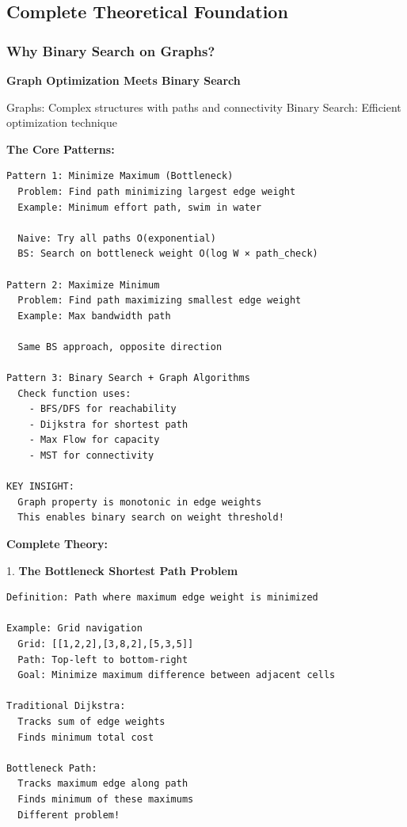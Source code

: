 \documentclass[11pt,a4paper,oneside]{book}
\begin{document}
\subsection{Complete Theoretical Foundation}

\subsubsection{Why Binary Search on Graphs?}

\begin{tcolorbox}[
    enhanced,breakable,
    colback=white,
    colframe=deepblue,
    boxrule=1.5pt,
    arc=3mm,
    title=\textbf{The Bottleneck and Reachability Paradigm}
]
\textbf{Graph Optimization Meets Binary Search}

Graphs: Complex structures with paths and connectivity
Binary Search: Efficient optimization technique

\textbf{The Core Patterns:}
\begin{verbatim}
Pattern 1: Minimize Maximum (Bottleneck)
  Problem: Find path minimizing largest edge weight
  Example: Minimum effort path, swim in water
  
  Naive: Try all paths O(exponential)
  BS: Search on bottleneck weight O(log W × path_check)

Pattern 2: Maximize Minimum  
  Problem: Find path maximizing smallest edge weight
  Example: Max bandwidth path
  
  Same BS approach, opposite direction

Pattern 3: Binary Search + Graph Algorithms
  Check function uses:
    - BFS/DFS for reachability
    - Dijkstra for shortest path
    - Max Flow for capacity
    - MST for connectivity

KEY INSIGHT:
  Graph property is monotonic in edge weights
  This enables binary search on weight threshold!
\end{verbatim}

\textbf{Complete Theory:}

1. \textbf{The Bottleneck Shortest Path Problem}
\begin{verbatim}
Definition: Path where maximum edge weight is minimized

Example: Grid navigation
  Grid: [[1,2,2],[3,8,2],[5,3,5]]
  Path: Top-left to bottom-right
  Goal: Minimize maximum difference between adjacent cells

Traditional Dijkstra:
  Tracks sum of edge weights
  Finds minimum total cost
  
Bottleneck Path:
  Tracks maximum edge along path
  Finds minimum of these maximums
  Different problem!


\end{verbatim}
\end{tcolorbox}
\end{document}
